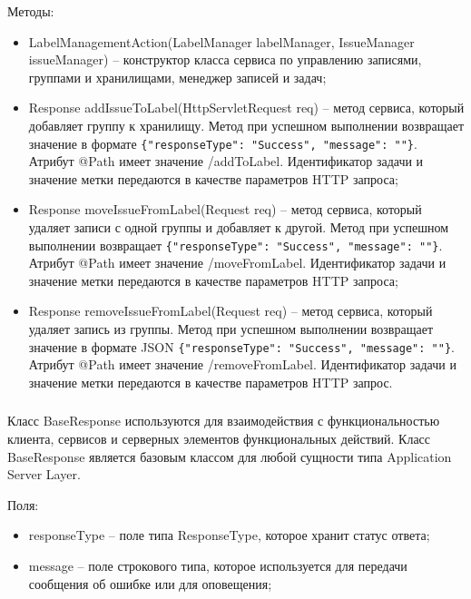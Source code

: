 Методы:
\begin{itemize}
  \item LabelManagementAction(LabelManager labelManager, IssueManager \\issueManager) – конструктор класса сервиса по управлению записями, группами и хранилищами, менеджер записей и задач;
  \item Response addIssueToLabel(HttpServletRequest req) – метод сервиса, который добавляет группу к хранилищу. Метод при успешном выполнении возвращает значение в формате \lstinline!{"responseType": "Success", "message": ""}!.\\ Атрибут @Path имеет значение /addToLabel. Идентификатор задачи и значение метки передаются в качестве параметров HTTP запроса;
  \item Response moveIssueFromLabel(Request req) – метод сервиса, который удаляет записи с одной группы и добавляет к другой. Метод при успешном выполнении возвращает \lstinline!{"responseType": "Success", "message": ""}!. Атрибут @Path имеет значение /moveFromLabel. Идентификатор задачи и значение метки передаются в качестве параметров HTTP запроса;
  \item Response removeIssueFromLabel(Request req) – метод сервиса, который удаляет запись из группы. Метод при успешном выполнении возвращает значение в формате JSON \lstinline!{"responseType": "Success", "message": ""}!. Атрибут @Path имеет значение /removeFromLabel. Идентификатор задачи и значение метки передаются в качестве параметров HTTP запрос.
\end{itemize}

\subsubsection{}
\label{sub:arch_and_mod:application_server_layer:base_response}

Класс BaseResponse используются для взаимодействия с функциональностью клиента, сервисов и серверных элементов функциональных действий. Класс BaseResponse является базовым классом для любой сущности типа Application Server Layer.

Поля:
\begin{itemize}
  \item responseType – поле типа ResponseType, которое хранит статус ответа;
  \item message – поле строкового типа, которое используется для передачи сообщения об ошибке или для оповещения;
\end{itemize}


